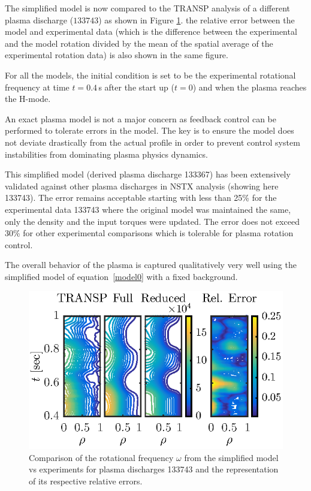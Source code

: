 \documentclass[12pt]{iopart}
\begin{document}
The simplified model is now compared to the TRANSP analysis of a different plasma discharge ($133743$) as shown in Figure \ref{fig10}. the relative error between the model and experimental data (which is the difference between the experimental and the model rotation divided by the mean of the spatial average of the experimental rotation data) is also shown in  the same figure.

For all the models, the initial condition is set to be the experimental rotational frequency at  time $t=0.4$\,s after the start up ($t=0$) and when the plasma reaches the H-mode.

An exact plasma model is not a major concern as feedback control can be performed to tolerate errors in the model. The key is to ensure the model does not deviate drastically from the actual profile in order to prevent control system instabilities from dominating plasma physics dynamics.

This simplified model (derived plasma discharge 133367) has been extensively validated against other plasma discharges in NSTX analysis (showing here 133743). The error remains acceptable starting with less than 25\% for the  experimental data 133743 where the original model was maintained the same, only the density and the input torques were updated. The error does not exceed 30\% for other experimental comparisons which is tolerable for plasma rotation control.

The overall behavior of the plasma is captured qualitatively very well using the simplified model of equation~\ref{model0} with a fixed background. 

\begin{figure}
\includegraphics{imene_figs/fig10b} %
\caption{Comparison of the rotational frequency $\omega$ from the simplified model vs experiments for plasma discharges 133743  and the representation of its respective relative errors.}
\label{fig10}
\end{figure}
\end{document}
